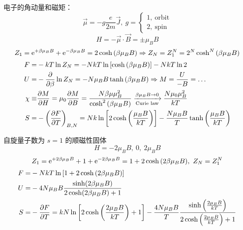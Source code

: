 电子的角动量和磁矩：\[
    \vec{\mu} = - g \frac{e}{2 m} \vec{J},\ g = \begin{cases}
        1,\ \text{orbit} \\
        2,\ \text{spin}
    \end{cases}\] \[
    H = - \vec{\mu} \cdot \vec{B} = \pm \mu_B B
\] \[
    Z_1 = \mathrm{e}^{+ \beta \mu_{B} B} + \mathrm{e}^{- \beta \mu_{B} B} = 2 \cosh \qty(\beta \mu_B B) \Rightarrow Z_N = Z_1^N = 2^N \cosh^N \qty(\beta \mu_B B)
\] \begin{align*}
    F =         & - k T \ln{Z_N} = - N k T \ln \qty[\cosh \qty(\beta \mu_B B)] - N k T \ln{2}                                                                                             \\
    U =         & - \pdv{\beta} \ln{Z_N} = - N \mu_B B \tanh \qty(\beta \mu_B B) \Rightarrow M = \frac{U}{- B} = \dots                                                                    \\
    \chi \equiv & \pdv{M}{H} = \mu_0 \pdv{M}{B} = \frac{N \beta \mu \mu_B^2}{\cosh^2 \qty(\beta \mu_B B)} \xrightarrow[\text{Curie law}]{\beta \mu_B B \to 0} \frac{N \mu_0 \mu_B^2}{k T} \\
    S =         & - \qty(\pdv{F}{T})_{B, N} = N k \ln \qty[2 \cosh \qty(\frac{\mu_B B}{k T})] - \frac{N \mu_B B}{T} \tanh \qty(\frac{\mu_B B}{k T})
\end{align*}

\begin{framed}
    自旋量子数为 $s = 1$ 的顺磁性固体 \[
        H = - 2 \mu_B B,\ 0,\ 2 \mu_B B
    \] \[
        Z_1 = \mathrm{e}^{+ 2 \beta \mu_B B} + 1 + \mathrm{e}^{- 2 \beta \mu_B B} = 1 + 2 \cosh \qty(2 \beta \mu_B B),\ Z_N = Z_1^N
    \] \begin{align*}
        F = & - N k T \ln \qty[1 + 2 \cosh \qty(2 \beta \mu_B B)]                                                                                                                                                    \\
        U = & - 4 N \mu_B B \frac{\sinh (2 \beta \mu_B B )}{2 \cosh (2 \beta \mu_B B)+1}                                                                                                                             \\
        S = & - \pdv{F}{T} = k N \ln \left[2 \cosh \left(\frac{2 \mu_B B}{k T}\right)+1\right] - \frac{4 N \mu_B B}{T} \frac{\sinh \left(\frac{2 \mu_B B}{k T}\right)}{2 \cosh \left(\frac{2 \mu_B B}{k T}\right)+1}
    \end{align*}
\end{framed}


